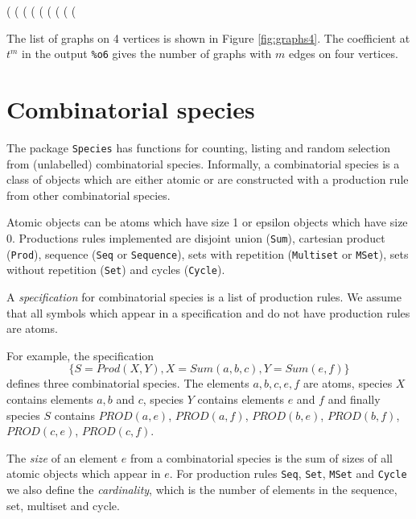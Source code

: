 \documentclass[11pt]{article}
\newcommand{\command}[1]{\texttt{#1}}
\newcommand{\DEF}[1]{{\em #1}}
\begin{document}
\begin{example}
(%
(%
(%
(%
(%
(%
(%
(%
(%
\end{example}
%
The list of graphs on 4 vertices is shown in Figure \ref{fig:graphs4}.
The coefficient at $t^m$ in the output \verb|%o6|
gives the number of graphs with $m$ edges on four vertices.

\section{Combinatorial species}

The package \command{Species} has functions for counting, listing and
random selection from (unlabelled) combinatorial species. Informally,
a combinatorial species is a class of objects which are either atomic
or are constructed with a production rule from other combinatorial
species.

Atomic objects can be atoms which have size 1 or epsilon objects which
have size 0. Productions rules implemented are disjoint union
(\command{Sum}), cartesian product (\command{Prod}), sequence
(\command{Seq} or \command{Sequence}), sets with repetition
(\command{Multiset} or \command{MSet}), sets without repetition
(\command{Set}) and cycles (\command{Cycle}).

A \DEF{specification} for combinatorial species is a list of
production rules. We assume that all symbols which appear in a
specification and do not have production rules are atoms.

For example, the specification
$$
\{S=Prod(X, Y), X=Sum(a, b, c), Y=Sum(e, f)\}
$$
defines three combinatorial species. The elements $a, b, c, e, f$ are
atoms, species $X$ contains elements $a, b$ and $c$, species $Y$
contains elements $e$ and $f$ and finally species $S$ contains
$PROD(a, e)$, $PROD(a, f)$, $PROD(b, e)$, $PROD(b, f)$, $PROD(c, e)$,
$PROD(c, f)$.

The \DEF{size} of an element $e$ from a combinatorial species is the
sum of sizes of all atomic objects which appear in $e$. For production
rules \command{Seq}, \command{Set}, \command{MSet} and \command{Cycle}
we also define the \DEF{cardinality}, which is the number of elements
in the sequence, set, multiset and cycle.
\end{document}
